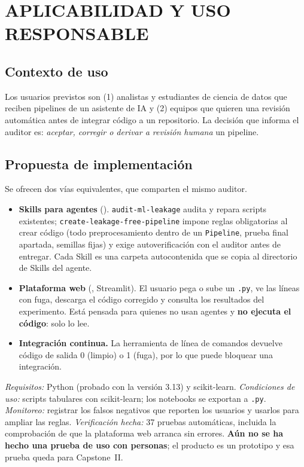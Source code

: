 
\chapter{APLICABILIDAD Y USO RESPONSABLE}
\label{ch:aplicabilidad}

\section{Contexto de uso}

Los usuarios previstos son (1) analistas y estudiantes de ciencia de datos que reciben pipelines de un asistente de IA y (2) equipos que quieren una revisión automática antes de integrar código a un repositorio. La decisión que informa el auditor es: \emph{aceptar, corregir o derivar a revisión humana} un pipeline.

\section{Propuesta de implementación}

Se ofrecen dos vías equivalentes, que comparten el mismo auditor.

\begin{itemize}
  \item \textbf{Skills para agentes} (). \texttt{audit-ml-leakage} audita y repara scripts existentes; \texttt{create-\allowbreak leakage-\allowbreak free-\allowbreak pipeline} impone reglas obligatorias al crear código (todo preprocesamiento dentro de un \texttt{Pipeline}, prueba final apartada, semillas fijas) y exige autoverificación con el auditor antes de entregar. Cada Skill es una carpeta autocontenida que se copia al directorio de Skills del agente.
  \item \textbf{Plataforma web} (, Streamlit). El usuario pega o sube un \texttt{.py}, ve las líneas con fuga, descarga el código corregido y consulta los resultados del experimento. Está pensada para quienes no usan agentes y \textbf{no ejecuta el código}: solo lo lee.
  \item \textbf{Integración continua.} La herramienta de línea de comandos devuelve código de salida 0 (limpio) o 1 (fuga), por lo que puede bloquear una integración.
\end{itemize}

\emph{Requisitos:} Python (probado con la versión 3.13) y scikit-learn. \emph{Condiciones de uso:} scripts tabulares con scikit-learn; los notebooks se exportan a \texttt{.py}. \emph{Monitoreo:} registrar los falsos negativos que reporten los usuarios y usarlos para ampliar las reglas. \emph{Verificación hecha:} 37 pruebas automáticas, incluida la comprobación de que la plataforma web arranca sin errores. \textbf{Aún no se ha hecho una prueba de uso con personas}; el producto es un prototipo y esa prueba queda para Capstone~II.

